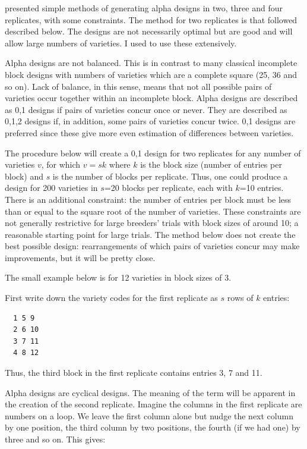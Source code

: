 \documentclass[
]{book}
\begin{document}
\citet{patterson_new_1976} presented simple methods of generating alpha designs in two, three and four replicates, with some constraints. The method for two replicates is that followed described below. The designs are not necessarily optimal but are good and will allow large numbers of varieties. I used to use these extensively.

Alpha designs are not balanced. This is in contrast to many classical incomplete block designs with numbers of varieties which are a complete square (25, 36 and so on). Lack of balance, in this sense, means that not all possible pairs of varieties occur together within an incomplete block. Alpha designs are described as 0,1 designs if pairs of varieties concur once or never. They are described as 0,1,2 designs if, in addition, some pairs of varieties concur twice. 0,1 designs are preferred since these give more even estimation of differences between varieties.

The procedure below will create a 0,1 design for two replicates for any number of varieties \(v\), for which \(v = sk\) where \(k\) is the block size (number of entries per block) and \(s\) is the number of blocks per replicate. Thus, one could produce a design for 200 varieties in \(s\)=20 blocks per replicate, each with \(k\)=10 entries. There is an additional constraint: the number of entries per block must be less than or equal to the square root of the number of varieties. These constraints are not generally restrictive for large breeders' trials with block sizes of around 10; a reasonable starting point for large trials. The method below does not create the best possible design: rearrangements of which pairs of varieties concur may make improvements, but it will be pretty close.

The small example below is for 12 varieties in block sizes of 3.

First write down the variety codes for the first replicate as \(s\) rows of \(k\) entries:

\begin{verbatim}
  1 5 9
  2 6 10
  3 7 11
  4 8 12
\end{verbatim}

Thus, the third block in the first replicate contains entries 3, 7 and 11.

Alpha designs are cyclical designs. The meaning of the term will be apparent in the creation of the second replicate. Imagine the columns in the first replicate are numbers on a loop. We leave the first column alone but nudge the next column by one position, the third column by two positions, the fourth (if we had one) by three and so on. This gives:
\end{document}
